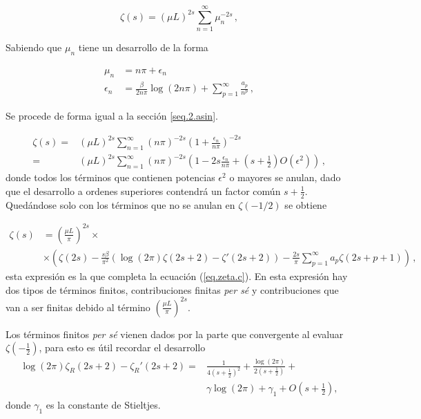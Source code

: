 \begin{equation}
\zeta (s) = \left( \mu L \right) ^{2s} \sum _{n=1} ^{\infty} \mu _n ^{-2s}
\, ,
\end{equation}

Sabiendo que $\mu _n$ tiene un desarrollo de la forma

\begin{equation}
\begin{aligned}
\mu _n  &= 
			n \pi + \epsilon _n \\
			\epsilon _n &= 
			\frac{ \beta }{2 n \pi } \log (2 n \pi) +
			\sum _{p=1} ^{\infty} \frac{a _p}{n ^p }
			\, ,
\end{aligned}
\end{equation}

Se procede de forma igual a la sección \ref{seq.2.asin}.

\begin{equation}
\begin{aligned}
\zeta (s) =& 
( \mu L ) ^{2s}
\sum _{n=1} ^{\infty}
( n \pi) ^{-2s} \left( 1 + \frac{ \epsilon _n }{n \pi } \right) ^{-2s } \\
 =& 
(\mu L) ^{2s} \sum _{n=1} ^{\infty}
( n \pi) ^{-2s} \left(
						1 -2s  \frac{\epsilon _n}{n \pi} + 
						\left( s + \frac{1}{2} \right) O( \epsilon ^2 )
						\right)
\, ,
\end{aligned}
\end{equation}
donde todos los términos que contienen potencias $\epsilon ^2$ o mayores se anulan, dado que el desarrollo a ordenes superiores contendrá un factor común $s+ \frac{1}{2}$. Quedándose solo con los términos que no se anulan en $\zeta (-1/2)$ se obtiene


\begin{align}
\zeta (s) &= \left( \frac{\mu L}{\pi} \right) ^{2s} \times \\
			\nonumber
			&\times
			\left(
					\zeta (2s) - \frac{s \beta}{\pi ^2} 
						\left(
							\log (2 \pi ) \zeta (2s+2) - \zeta '(2s+2)
							\right)-
					\frac{2 s}{\pi} \sum _{p=1} ^{\infty}
						a _p \zeta (2s+p+1)
					\right)
\, ,					
\end{align}
esta expresión es la que completa la ecuación (\ref{eq.zeta.c}).
En esta expresión hay dos tipos de términos finitos, contribuciones finitas {\it per sé} y contribuciones que van a ser finitas debido al término $ \left( \frac{\mu L}{\pi}\right) ^{2s}$.


Los términos finitos {\it per sé} vienen dados por la parte que convergente al evaluar $\zeta (-\frac{1}{2} )$, para esto es útil recordar el desarrollo
\begin{align}\label{cortar}
	\log (2 \pi) \zeta _R (2s+2) -
	\zeta _R ' (2s+2) = & 
	\frac{1}{4 \left( s + \frac{1}{2} \right) ^2} + 
	\frac{ \log (2 \pi ) }{2 \left( s + \frac{1}{2} \right) } + \\
	& \gamma \log (2 \pi ) + \gamma _1 + O \left( s + \frac{1}{2} \right)
	 ,
\end{align}
donde $\gamma _1$ es la constante de Stieltjes.


